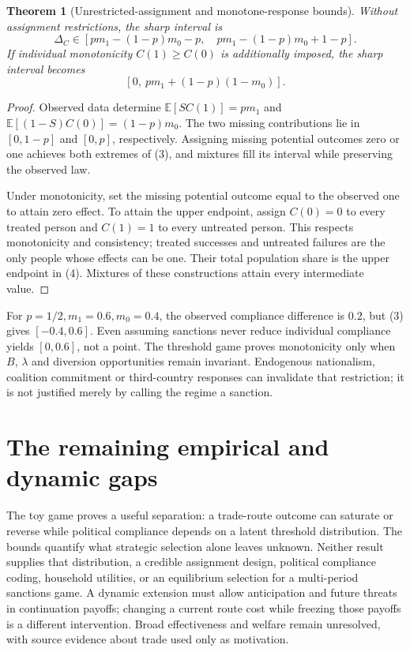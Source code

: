 \documentclass[11pt,a4paper]{article}
\newtheorem{theorem}{Theorem}[section]
\newcommand{\E}{\mathbb E}
\begin{document}
\begin{theorem}[Unrestricted-assignment and monotone-response bounds]
Without assignment restrictions, the sharp interval is
\[
 \Delta_C\in[p m_1-(1-p)m_0-p,\quad
                  p m_1-(1-p)m_0+1-p]. \tag{3}
\]
If individual monotonicity $C(1)\ge C(0)$ is additionally imposed, the sharp interval becomes
\[
 [0,\ p m_1+(1-p)(1-m_0)]. \tag{4}
\]
\end{theorem}
\begin{proof}
Observed data determine $\E[SC(1)]=pm_1$ and $\E[(1-S)C(0)]=(1-p)m_0$. The two missing contributions lie in $[0,1-p]$ and $[0,p]$, respectively. Assigning missing potential outcomes zero or one achieves both extremes of (3), and mixtures fill its interval while preserving the observed law.

Under monotonicity, set the missing potential outcome equal to the observed one to attain zero effect. To attain the upper endpoint, assign $C(0)=0$ to every treated person and $C(1)=1$ to every untreated person. This respects monotonicity and consistency; treated successes and untreated failures are the only people whose effects can be one. Their total population share is the upper endpoint in (4). Mixtures of these constructions attain every intermediate value.
\end{proof}

For $p=1/2,m_1=0.6,m_0=0.4$, the observed compliance difference is $0.2$, but (3) gives $[-0.4,0.6]$. Even assuming sanctions never reduce individual compliance yields $[0,0.6]$, not a point. The threshold game proves monotonicity only when $B$, $\lambda$ and diversion opportunities remain invariant. Endogenous nationalism, coalition commitment or third-country responses can invalidate that restriction; it is not justified merely by calling the regime a sanction.

\section{The remaining empirical and dynamic gaps}
The toy game proves a useful separation: a trade-route outcome can saturate or reverse while political compliance depends on a latent threshold distribution. The bounds quantify what strategic selection alone leaves unknown. Neither result supplies that distribution, a credible assignment design, political compliance coding, household utilities, or an equilibrium selection for a multi-period sanctions game. A dynamic extension must allow anticipation and future threats in continuation payoffs; changing a current route cost while freezing those payoffs is a different intervention. Broad effectiveness and welfare remain unresolved, with source evidence about trade used only as motivation.
\end{document}
